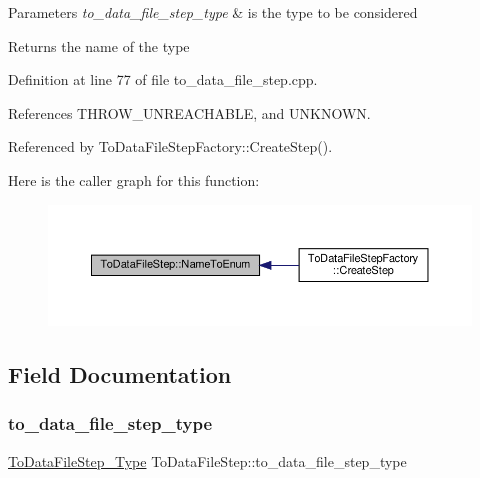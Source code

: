 \begin{DoxyParams}{Parameters}
{\em to\+\_\+data\+\_\+file\+\_\+step\+\_\+type} & is the type to be considered \\
\hline
\end{DoxyParams}
\begin{DoxyReturn}{Returns}
the name of the type 
\end{DoxyReturn}


Definition at line 77 of file to\+\_\+data\+\_\+file\+\_\+step.\+cpp.



References T\+H\+R\+O\+W\+\_\+\+U\+N\+R\+E\+A\+C\+H\+A\+B\+LE, and U\+N\+K\+N\+O\+WN.



Referenced by To\+Data\+File\+Step\+Factory\+::\+Create\+Step().

Here is the caller graph for this function\+:
\nopagebreak
\begin{figure}[H]
\begin{center}
\leavevmode
\includegraphics[width=350pt]{d6/d54/classToDataFileStep_a9cca166c6c49eeb41239edfe3669abf9_icgraph}
\end{center}
\end{figure}


\subsection{Field Documentation}
\mbox{\label{classToDataFileStep_aa9fb3dead3ab5f8405542d47b654ad32}} 
\subsubsection{\texorpdfstring{to\+\_\+data\+\_\+file\+\_\+step\+\_\+type}{to\_data\_file\_step\_type}}
{\footnotesize\ttfamily \hyperlink{to__data__file__step_8hpp_a11e82da7dd30bcde03a139fc0baa4f38}{To\+Data\+File\+Step\+\_\+\+Type} To\+Data\+File\+Step\+::to\+\_\+data\+\_\+file\+\_\+step\+\_\+type\hspace{0.3cm}{\ttfamily [protected]}}



